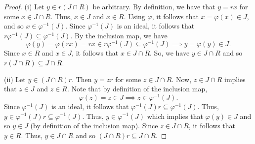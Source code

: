 \documentclass[a4paper]{article}
\begin{document}
\begin{problem}
\begin{enumerate}
\begin{proof}
           (i) Let \( y \in r ( J \cap R ) \) be arbitrary. By definition, we have that \( y = rx  \) for some \( x \in J \cap R  \). Thus, \( x \in J  \) and \( x \in R  \). Using \( \varphi \), it follows that \( x = \varphi(x) \in J  \), and so \( x \in \varphi^{-1}(J)  \). Since \( \varphi^{-1}(J) \) is an ideal, it follows that \( r \varphi^{-1}(J) \subseteq \varphi^{-1}(J)  \). By the inclusion map, we have 
           \[ \varphi(y) = \varphi(rx) = rx \in r \varphi^{-1}(J) \subseteq \varphi^{-1}(J) \implies y = \varphi(y) \in J. \]
           Since \( x \in R  \) and \( x \in J  \), it follows that \( x \in J \cap R  \). So, we have \( y \in J \cap R  \) and so \( r(J \cap R) \subseteq J \cap R \).

           (ii) Let \( y \in (J \cap R) r  \). Then \( y = z r  \) for some \( z \in J \cap R  \). Now, \( z \in J \cap R  \) implies that \( z \in J  \) and \( z \in R  \). Note that by definition of the inclusion map, 
           \[  \varphi(z) = z \in J \implies z \in \varphi^{-1}(J). \]
           Since \( \varphi^{-1}(J) \) is an ideal, it follows that \( \varphi^{-1}(J) r \subseteq \varphi^{-1}(J) \). Thus, \( y \in \varphi^{-1}(J) r \subseteq \varphi^{-1}(J)  \). Thus, \( y \in \varphi^{-1}(J) \) which implies that \( \varphi(y) \in J  \) and so \( y \in J  \) (by definition of the inclusion map). Since \( z \in J \cap R  \), it follows that \( y \in R  \). Thus, \( y \in J \cap R  \) and so \( (J \cap R ) r \subseteq J \cap R  \). 


\end{proof}
\end{enumerate}
\end{problem}
\end{document}

